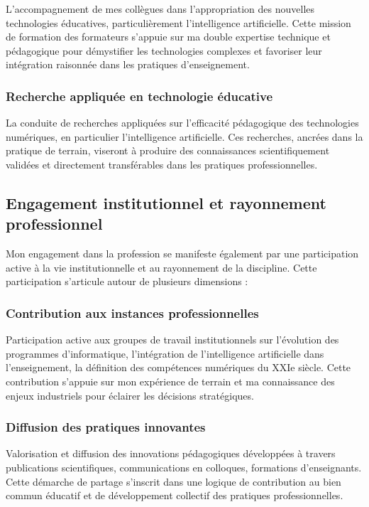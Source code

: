 \documentclass[12pt,a4paper]{report}
\begin{document}
L'accompagnement de mes collègues dans l'appropriation des nouvelles technologies éducatives, particulièrement l'intelligence artificielle. Cette mission de formation des formateurs s'appuie sur ma double expertise technique et pédagogique pour démystifier les technologies complexes et favoriser leur intégration raisonnée dans les pratiques d'enseignement.

\subsubsection*{Recherche appliquée en technologie éducative}

La conduite de recherches appliquées sur l'efficacité pédagogique des technologies numériques, en particulier l'intelligence artificielle. Ces recherches, ancrées dans la pratique de terrain, viseront à produire des connaissances scientifiquement validées et directement transférables dans les pratiques professionnelles.

\subsection*{Engagement institutionnel et rayonnement professionnel}

Mon engagement dans la profession se manifeste également par une participation active à la vie institutionnelle et au rayonnement de la discipline. Cette participation s'articule autour de plusieurs dimensions :

\subsubsection*{Contribution aux instances professionnelles}

Participation active aux groupes de travail institutionnels sur l'évolution des programmes d'informatique, l'intégration de l'intelligence artificielle dans l'enseignement, la définition des compétences numériques du XXIe siècle. Cette contribution s'appuie sur mon expérience de terrain et ma connaissance des enjeux industriels pour éclairer les décisions stratégiques.

\subsubsection*{Diffusion des pratiques innovantes}

Valorisation et diffusion des innovations pédagogiques développées à travers publications scientifiques, communications en colloques, formations d'enseignants. Cette démarche de partage s'inscrit dans une logique de contribution au bien commun éducatif et de développement collectif des pratiques professionnelles.
\end{document}
